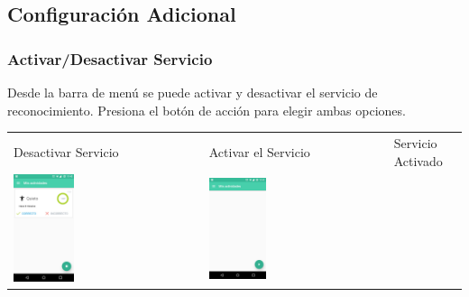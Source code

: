 {\subsection{Configuración Adicional}
\label{config_adic:configuracion-adicional}\label{config_adic:har-conf-advanced}\label{config_adic::doc}

\subsubsection{Activar/Desactivar Servicio}
\label{config_adic:activar-desactivar-servicio}
Desde la barra de menú se puede activar y desactivar el servicio de reconocimiento. Presiona el botón
de acción para elegir ambas opciones.

\begin{table}[!htbp]
\begin{tabular}{lll}
\textsf{\relax 
Desactivar Servicio
} & \textsf{\relax 
Activar el Servicio
} & \textsf{\relax 
Servicio Activado
}\\
    {\includegraphics[width=0.33\textwidth]{anexos/graphics/disable_serv.jpg}}
 & 
    {\includegraphics[width=0.33\textwidth]{anexos/graphics/enable_serv.jpg}}

\end{tabular}
\end{table}}
